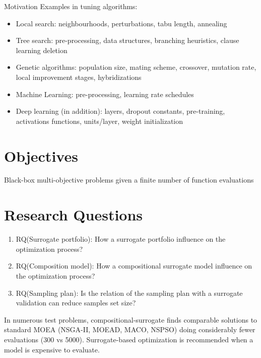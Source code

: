     Motivation Examples in tuning algorithms:
    \begin{itemize}
        \item Local search: neighbourhoods, perturbations, tabu length, annealing
        \item Tree search: pre-processing, data structures, branching heuristics, clause learning deletion
        \item Genetic algorithms: population size, mating scheme, crossover, mutation rate, local improvement stages, hybridizations
        \item Machine Learning: pre-processing, learning rate schedules
        \item Deep learning (in addition): layers, dropout constants, pre-training, activations functions, units/layer, weight initialization  
    \end{itemize}

\section{Objectives}
    Black-box multi-objective problems given a finite number of function evaluations

\section{Research Questions}
\begin{enumerate}
    \item RQ(Surrogate portfolio): How a surrogate portfolio influence on the optimization process?
    \item RQ(Composition model): How a compositional surrogate model influence on the optimization process?
    \item RQ(Sampling plan): Is the relation of the sampling plan with a surrogate validation can reduce samples set size?
\end{enumerate}

In numerous test problems, compositional-surrogate finds comparable solutions to standard MOEA (NSGA-II, MOEAD, MACO, NSPSO) doing considerably fewer evaluations (300 vs 5000). 
Surrogate-based optimization is recommended when a model is expensive to evaluate.


